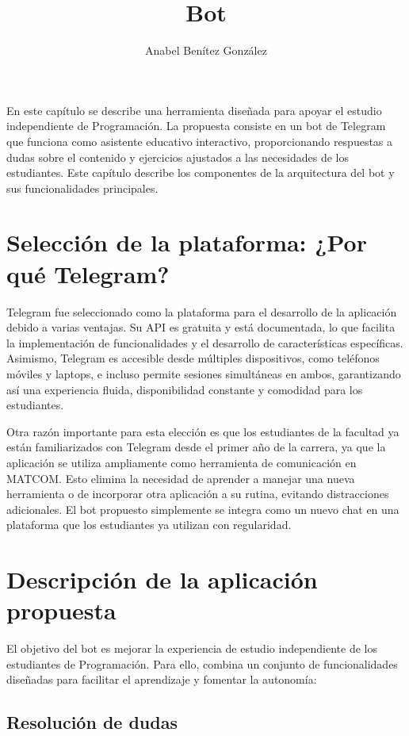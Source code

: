 \documentclass{article}
\title{Bot}
\author{Anabel Benítez González}
\date{}
\begin{document}
\tableofcontents
\maketitle

En este capítulo se describe una herramienta diseñada para apoyar el estudio independiente de Programación. La propuesta consiste en un bot de Telegram que funciona como asistente educativo interactivo, proporcionando respuestas a dudas sobre el contenido y ejercicios ajustados a las necesidades de los estudiantes. Este capítulo describe los componentes de la arquitectura del bot y sus funcionalidades principales.

\section{Selección de la plataforma: ¿Por qué Telegram?}

Telegram fue seleccionado como la plataforma para el desarrollo de la aplicación debido a varias ventajas. Su API es gratuita y está documentada, lo que facilita la implementación de funcionalidades y el desarrollo de características específicas. Asimismo, Telegram es accesible desde múltiples dispositivos, como teléfonos móviles y laptops, e incluso permite sesiones simultáneas en ambos, garantizando así una experiencia fluida, disponibilidad constante y comodidad para los estudiantes.

Otra razón importante para esta elección es que los estudiantes de la facultad ya están familiarizados con Telegram desde el primer año de la carrera, ya que la aplicación se utiliza ampliamente como herramienta de comunicación en MATCOM. Esto elimina la necesidad de aprender a manejar una nueva herramienta o de incorporar otra aplicación a su rutina, evitando distracciones adicionales. El bot propuesto simplemente se integra como un nuevo chat en una plataforma que los estudiantes ya utilizan con regularidad.

\section{Descripción de la aplicación propuesta}

El objetivo del bot es mejorar la experiencia de estudio independiente de los estudiantes de Programación. Para ello, combina un conjunto de funcionalidades diseñadas para facilitar el aprendizaje y fomentar la autonomía:

\subsection{Resolución de dudas}
\end{document}
